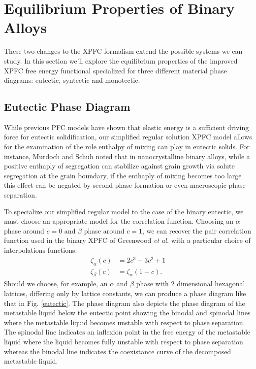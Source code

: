 \documentclass[showkeys, prb, reprint]{revtex4-1}
\begin{document}
\section{Equilibrium Properties of Binary Alloys} %

These two changes to the XPFC formalism extend the possible systems we can
study. In this section we'll explore the equilibrium properties of the improved
XPFC free energy functional specialized for three different material phase
diagrams: eutectic, syntectic and monotectic.

\subsection{Eutectic Phase Diagram} %

While previous PFC models have shown that elastic energy is a sufficient
driving force for eutectic solidification, our simplified regular solution XPFC
model allows for the examination of the role enthalpy of mixing can play in
eutectic solids.  For instance, Murdoch and Schuh noted that in nanocrystalline
binary alloys, while a positive enthaply of segregation can stabilize against
grain growth via solute segregation at the grain boundary, if the enthaply of
mixing becomes too large this effect can be negated by second phase formation
or even macroscopic phase separation\cite{MURDOCH13}. 

To specialize our simplified regular model to the case of the binary eutectic,
we must choose an appropriate model for the correlation function. Choosing an
$\alpha$ phase around $c = 0$ and $\beta$ phase around $c = 1$, we can recover
the pair correlation function used in the binary XPFC of Greenwood \textit{et
al.} with a particular choice of interpolations functions: 
%
\begin{align}
   \zeta_\alpha(c) &= 2c^3 - 3c^2 + 1 \\
   \zeta_\beta(c) &= \zeta_\alpha(1 - c).
\end{align}
%
Should we choose, for example, an $\alpha$ and $\beta$ phase with 2 dimensional
hexagonal lattices, differing only by lattice constants, we can produce a phase
diagram like that in Fig. \ref{eutectic}. The phase diagram also depicts the
phase diagram of the metastable liquid below the eutectic point showing the
binodal and spinodal lines where the metastable liquid becomes unstable with
respect to phase separation. The spinodal line indicates an inflexion point in
the free energy of the metastable liquid where the liquid becomes fully
unstable with respect to phase separation whereas the binodal line indicates
the coexistance curve of the decomposed metastable liquid.
\end{document}
